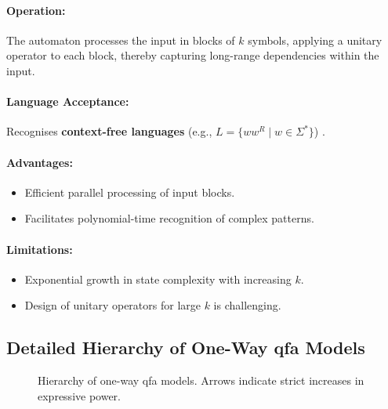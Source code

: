 \paragraph{Operation:}  
The automaton processes the input in blocks of \( k \) symbols, applying a unitary operator to each block, thereby capturing long-range dependencies within the input.

\paragraph{Language Acceptance:}  
Recognises \textbf{context-free languages} (e.g., \( L = \{ww^R \mid w \in \Sigma^*\} \)) \cite{ravikumar2003}.

\paragraph{Advantages:}
\begin{itemize}
    \item Efficient parallel processing of input blocks.
    \item Facilitates polynomial-time recognition of complex patterns.
\end{itemize}

\paragraph{Limitations:}
\begin{itemize}
    \item Exponential growth in state complexity with increasing \( k \).
    \item Design of unitary operators for large \( k \) is challenging.
\end{itemize}

\subsection*{Detailed Hierarchy of One-Way \gls{qfa} Models}
\label{subsec:hierarchy-diagram}

\begin{figure}[ht]
    \centering
    \caption{Hierarchy of one-way \gls{qfa} models. Arrows indicate strict increases in expressive power.}
    \label{fig:qfa-hierarchy}
\end{figure}

